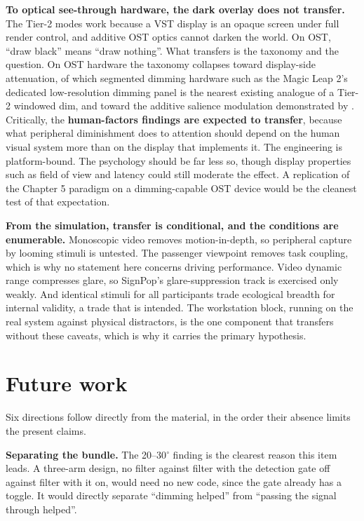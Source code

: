 \textbf{To optical see-through hardware, the dark overlay does not transfer.} The Tier-2 modes work
because a VST display is an opaque screen under full render control, and additive OST optics cannot
darken the world. On OST, ``draw black'' means ``draw nothing''. What transfers is the taxonomy and the
question. On OST hardware the taxonomy collapses toward display-side attenuation, of which segmented
dimming hardware such as the Magic Leap 2's dedicated low-resolution dimming panel \citep{magic2024}
is the nearest existing analogue of a Tier-2 windowed dim, and toward the additive salience
modulation demonstrated by \citet{sutton2022}. Critically, the \textbf{human-factors findings are
expected to transfer}, because what peripheral diminishment does to attention should depend on the
human visual system more than on the display that implements it. The engineering is platform-bound.
The psychology should be far less so, though display properties such as field of view and latency
could still moderate the effect. A replication of the Chapter 5 paradigm on a dimming-capable OST
device would be the cleanest test of that expectation.

\textbf{From the simulation, transfer is conditional, and the conditions are enumerable.} Monoscopic
video removes motion-in-depth, so peripheral capture by looming stimuli is untested. The passenger
viewpoint removes task coupling, which is why no statement here concerns driving performance. Video
dynamic range compresses glare, so SignPop's glare-suppression track is exercised only weakly. And
identical stimuli for all participants trade ecological breadth for internal validity, a trade that
is intended. The workstation block, running on the real system against physical distractors, is the
one component that transfers without these caveats, which is why it carries the primary hypothesis.

\section{Future work}

Six directions follow directly from the material, in the order their absence limits the present
claims.

\textbf{Separating the bundle.} The 20--30$^{\circ}$ finding is the clearest reason this item leads.
A three-arm design, no filter against filter with the detection gate off against filter with it on,
would need no new code, since the gate already has a toggle. It would directly separate ``dimming
helped'' from ``passing the signal through helped''.


